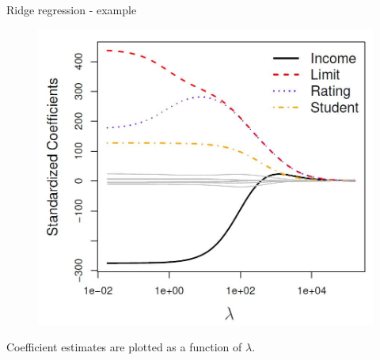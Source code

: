 \documentclass{beamer}
\begin{document}
\begin{frame}{Ridge regression - example}
\vspace{-1cm}
\begin{figure}
\includegraphics[scale=0.30]{IMG/Ridge.jpg}
\end{figure}
\vspace{-0.5cm}
\centering Coefficient estimates are plotted as a function of $\lambda$.
\end{frame}
\end{document}
